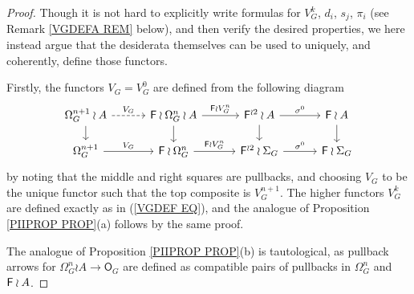 \documentclass[a4paper,10pt]{article}%
\begin{document}
\begin{proof}
Though it is not hard to explicitly write formulas for $V_G^k$, $d_i$, $s_j$, $\pi_i$ 
(see Remark \ref{VGDEFA REM} below),
and then verify the desired properties,
we here instead argue that the desiderata themselves can be used to uniquely, and coherently, define those functors. 

Firstly, the functors $V_G = V_G^0$ are defined from the following diagram
\[
\begin{tikzcd}[row sep = 1.3em,column sep = 3em]
	\Omega_{G}^{n+1} \wr A \ar[dashed]{r}{V_G} \ar{d}& 
	\Fin \wr \Omega_G^n \wr A \ar{r}{\Fin \wr V_{G}^n} \ar{d}&
	\Fin^{\wr 2} \wr A  \ar{d} \ar{r}{\sigma^0} &
	\Fin \wr A \ar{d}
\\
	\Omega_{G}^{n+1} \ar{r}{V_G} &
	\Fin \wr \Omega_{G}^{n} \ar{r}{\Fin \wr V_{G}^{n}} &
	\Fin^{\wr 2} \wr \Sigma_G \ar{r}{\sigma^0} &
	\Fin \wr \Sigma_G
\end{tikzcd}
\]
by noting that the middle and right squares are pullbacks, 
and choosing $V_G$ to be the unique functor such that the top composite is $V_G^{n+1}.$
The higher functors $V_G^k$ are defined exactly as in (\ref{VGDEF EQ}), and the analogue of Proposition \ref{PIIPROP PROP}(a) follows by the same proof.

The analogue of Proposition \ref{PIIPROP PROP}(b) is tautological, as pullback arrows for 
$\Omega_G^n \wr A \to \mathsf{O}_G$
are defined as compatible pairs of pullbacks in 
$\Omega_G^n$ and $\mathsf{F} \wr A$.


\end{proof}
\end{document}
